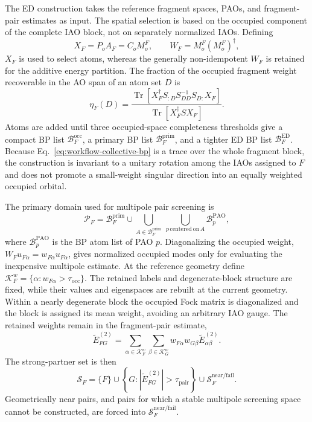 \documentclass[11pt]{article}
\begin{document}
The ED construction takes the reference fragment spaces, PAOs, and
fragment-pair estimates as input.  The spatial selection is based on the
occupied component of the complete IAO block, not on separately normalized
IAOs.  Defining
\begin{equation}
 X_F=P_oA_F=C_oM_o^F,
 \qquad
 W_F=M_o^F(M_o^F)^\dagger,
 \label{eq:workflow-spatial-weight}
\end{equation}
$X_F$ is used to select atoms, whereas the generally non-idempotent $W_F$ is
retained for the additive energy partition.  The fraction of the occupied
fragment weight recoverable in the AO span of an atom set $D$ is
\begin{equation}
 \eta_F(D)=
 \frac{\operatorname{Tr}\!\left[
 X_F^\dagger S_{:D}S_{DD}^{-1}S_{D:}X_F
 \right]}
 {\operatorname{Tr}[X_F^\dagger SX_F]}.
 \label{eq:workflow-collective-bp}
\end{equation}
Atoms are added until three occupied-space completeness thresholds give a
compact BP list $\mathcal B_F^{\mathrm{occ}}$, a primary BP list
$\mathcal B_F^{\mathrm{prim}}$, and a tighter ED BP list
$\mathcal B_F^{\mathrm{ED}}$.  Because Eq.~\eqref{eq:workflow-collective-bp}
is a trace over the whole fragment block, the construction is invariant to a
unitary rotation among the IAOs assigned to $F$ and does not promote a
small-weight singular direction into an equally weighted occupied orbital.

The primary domain used for multipole pair screening is
\begin{equation}
 \mathcal P_F=
 \mathcal B_F^{\mathrm{prim}}\cup
 \bigcup_{A\in\mathcal B_F^{\mathrm{prim}}}
 \ \bigcup_{p\,\mathrm{centered\ on}\,A}
 \mathcal B_p^{\mathrm{PAO}},
 \label{eq:workflow-iao-primary}
\end{equation}
where $\mathcal B_p^{\mathrm{PAO}}$ is the BP atom list of PAO $p$.
Diagonalizing the occupied weight,
$W_Fu_{F\alpha}=w_{F\alpha}u_{F\alpha}$, gives normalized occupied modes
only for evaluating the inexpensive multipole estimate.  At the reference
geometry define
$\mathcal K_F^w=\{\alpha:w_{F\alpha}>\tau_{\mathrm{occ}}\}$.  The retained
labels and degenerate-block structure are fixed, while their values and
eigenspaces are rebuilt at the current geometry.  Within a nearly degenerate
block the occupied Fock matrix is diagonalized and the block is assigned its
mean weight, avoiding an arbitrary IAO gauge.  The retained weights remain in
the fragment-pair estimate,
\begin{equation}
 \widetilde E_{FG}^{(2)}=
 \sum_{\alpha\in\mathcal K_F^w}
 \sum_{\beta\in\mathcal K_G^w}
 w_{F\alpha}w_{G\beta}
 \widetilde E_{\alpha\beta}^{(2)}.
 \label{eq:workflow-weighted-pair-estimate}
\end{equation}
The strong-partner set is then
\begin{equation}
 \mathcal S_F=\{F\}\cup
 \left\{G:\left|\widetilde E_{FG}^{(2)}\right|>
 \tau_{\mathrm{pair}}\right\}
 \cup\mathcal S_F^{\mathrm{near/fail}}.
 \label{eq:workflow-strong-set}
\end{equation}
Geometrically near pairs, and pairs for which a stable multipole screening
space cannot be constructed, are forced into
$\mathcal S_F^{\mathrm{near/fail}}$.
\end{document}
